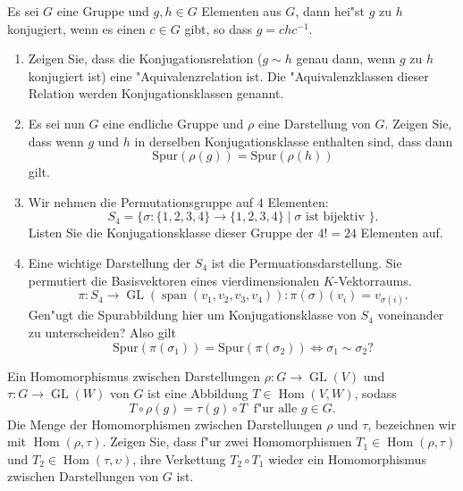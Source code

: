\documentclass[a4,11pt]{article}
\begin{document}
\begin{aufgabe}[4 Punkte]
Es sei $G$ eine Gruppe und $g,h \in G$ Elementen aus $G$, dann hei"st $g$ zu $h$ konjugiert, wenn es einen $c \in G$ gibt, so dass $g = chc^{-1}$.\begin{enumerate}
\item
Zeigen Sie, dass die Konjugationsrelation ($g \sim h$ genau dann, wenn $g$ zu $h$ konjugiert ist) eine "Aquivalenzrelation ist. Die "Aquivalenzklassen dieser Relation werden Konjugationsklassen genannt.
\item
Es sei nun $G$ eine endliche Gruppe und $\rho$ eine Darstellung von $G$. Zeigen Sie, dass wenn $g$ und $h$ in derselben Konjugationsklasse enthalten sind, dass dann
\[
\text{Spur}(\rho(g)) = \text{Spur}(\rho(h)) 
\]
gilt.
\item
Wir nehmen die Permutationsgruppe auf $4$ Elementen:
\[
S_4 = \{ \sigma : \{ 1,2,3,4 \} \to \{ 1,2,3,4 \} \mid \sigma \text{ ist bijektiv } \}.
\]
Listen Sie die Konjugationsklasse dieser Gruppe der $4! = 24$ Elementen auf.
\item
Eine wichtige Darstellung der $S_4$ ist die Permuationsdarstellung. Sie permutiert die Basisvektoren eines vierdimensionalen $K$-Vektorraums.
\[
\pi : S_4 \to \operatorname{GL}(\operatorname{span}(v_1, v_2, v_3, v_4)) : \pi(\sigma)(v_i) = v_{\sigma(i)}.
\]
Gen"ugt die Spurabbildung hier um Konjugationsklasse von $S_4$ voneinander zu unterscheiden? Also gilt
\[
\text{Spur}(\pi(\sigma_1)) = \text{Spur}(\pi(\sigma_2)) \Leftrightarrow \sigma_1 \sim \sigma_2 ?
\]
\end{enumerate}

\end{aufgabe}

\begin{aufgabe}[4 Punkte]
Ein Homomorphismus zwischen Darstellungen $\rho : G \to \operatorname{GL}(V)$ und $\tau : G \to \operatorname{GL}(W)$ von $G$ ist eine Abbildung $T \in \operatorname{Hom}(V,W)$, sodass
\[
T \circ \rho(g) = \tau(g) \circ T \ \text{ f"ur alle } g \in G.
\]
Die Menge der Homomorphismen zwischen Darstellungen $\rho$ und $\tau$, bezeichnen wir mit $\operatorname{Hom}(\rho, \tau)$.
Zeigen Sie, dass f"ur zwei Homomorphismen $T_1 \in \operatorname{Hom}(\rho, \tau)$ und $T_2 \in \operatorname{Hom}(\tau, \upsilon)$, ihre Verkettung $T_2 \circ T_1$ wieder ein Homomorphismus zwischen Darstellungen von $G$ ist.
\end{aufgabe}
\end{document}
